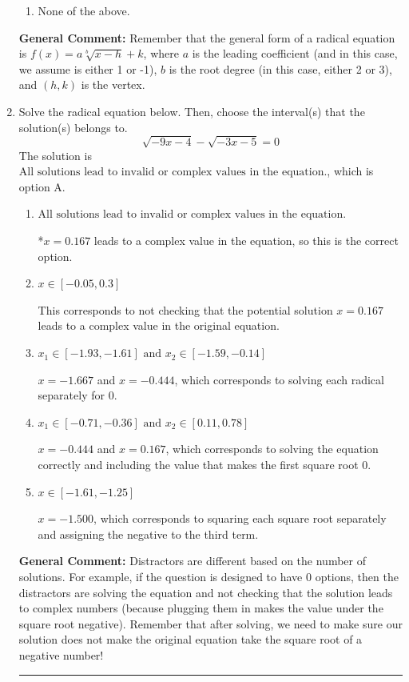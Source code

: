 \documentclass{extbook}[14pt]
\newcommand{\litem}[1]{\item #1

\rule{\textwidth}{0.4pt}}
\begin{document}
\begin{enumerate}
{\begin{enumerate}[label=\Alph*.]
\item None of the above.\end{enumerate}
\textbf{General Comment:} Remember that the general form of a radical equation is $ f(x) = a \sqrt[b]{x - h} + k $, where $a$ is the leading coefficient (and in this case, we assume is either 1 or -1), $b$ is the root degree (in this case, either 2 or 3), and $(h, k)$ is the vertex.
}
\litem{
Solve the radical equation below. Then, choose the interval(s) that the solution(s) belongs to.
\[ \sqrt{-9 x - 4} - \sqrt{-3 x - 5} = 0 \]The solution is \( \text{All solutions lead to invalid or complex values in the equation.} \), which is option A.\begin{enumerate}[label=\Alph*.]
\item \( \text{All solutions lead to invalid or complex values in the equation.} \)

*$x = 0.167$ leads to a complex value in the equation, so this is the correct option.
\item \( x \in [-0.05,0.3] \)

This corresponds to not checking that the potential solution $x = 0.167$ leads to a complex value in the original equation.
\item \( x_1 \in [-1.93, -1.61] \text{ and } x_2 \in [-1.59,-0.14] \)

$x = -1.667$ and $x = -0.444$, which corresponds to solving each radical separately for 0.
\item \( x_1 \in [-0.71, -0.36] \text{ and } x_2 \in [0.11,0.78] \)

$x = -0.444$ and $x = 0.167$, which corresponds to solving the equation correctly and including the value that makes the first square root 0.
\item \( x \in [-1.61,-1.25] \)

$x = -1.500$, which corresponds to squaring each square root separately and assigning the negative to the third term.
\end{enumerate}

\textbf{General Comment:} Distractors are different based on the number of solutions. For example, if the question is designed to have 0 options, then the distractors are solving the equation and not checking that the solution leads to complex numbers (because plugging them in makes the value under the square root negative). Remember that after solving, we need to make sure our solution does not make the original equation take the square root of a negative number!
}
\end{enumerate}
\end{document}
